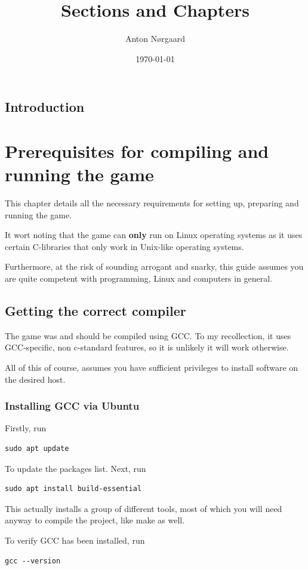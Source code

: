 \documentclass{report}
\title{Sections and Chapters}
\author{Anton Nørgaard}
\date{ \today}
\begin{document}
  
\maketitle
  
\tableofcontents

\section{Introduction}
\chapter{Prerequisites for compiling and running the game}   
This chapter details all the necessary requirements for setting up, preparing and running the game. 

It wort noting that the game can \textbf{only} run on Linux operating systems as it uses certain C-libraries that only work in Unix-like operating systems.

Furthermore, at the risk of sounding arrogant and snarky, this guide assumes you are quite competent with programming, Linux and computers in general. 
\section*{Getting the correct compiler}
The game was and should be compiled using GCC. To my recollection, it uses GCC-specific, non c-standard features, so it is unlikely it will work otherwise.

All of this of course, assumes you have sufficient privileges to install software on the desired host.
\subsection*{Installing GCC via Ubuntu}
Firstly, run
\begin{lstlisting}
sudo apt update
\end{lstlisting}
To update the packages list. Next, run

\begin{lstlisting}
sudo apt install build-essential
\end{lstlisting}
This actually installs a group of different tools, most of which you will need anyway to compile the project, like make as well.

To verify GCC has been installed, run

\begin{lstlisting}
gcc --version
\end{lstlisting}
\end{document}
